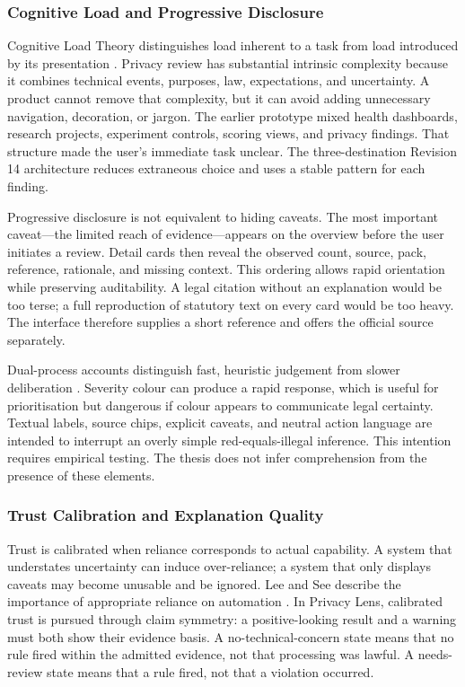 \subsubsection{Cognitive Load and Progressive Disclosure}

Cognitive Load Theory distinguishes load inherent to a task from load introduced by its presentation \cite{27}. Privacy review has substantial intrinsic complexity because it combines technical events, purposes, law, expectations, and uncertainty. A product cannot remove that complexity, but it can avoid adding unnecessary navigation, decoration, or jargon. The earlier prototype mixed health dashboards, research projects, experiment controls, scoring views, and privacy findings. That structure made the user's immediate task unclear. The three-destination Revision 14 architecture reduces extraneous choice and uses a stable pattern for each finding.

Progressive disclosure is not equivalent to hiding caveats. The most important caveat---the limited reach of evidence---appears on the overview before the user initiates a review. Detail cards then reveal the observed count, source, pack, reference, rationale, and missing context. This ordering allows rapid orientation while preserving auditability. A legal citation without an explanation would be too terse; a full reproduction of statutory text on every card would be too heavy. The interface therefore supplies a short reference and offers the official source separately.

Dual-process accounts distinguish fast, heuristic judgement from slower deliberation \cite{22}. Severity colour can produce a rapid response, which is useful for prioritisation but dangerous if colour appears to communicate legal certainty. Textual labels, source chips, explicit caveats, and neutral action language are intended to interrupt an overly simple red-equals-illegal inference. This intention requires empirical testing. The thesis does not infer comprehension from the presence of these elements.

\subsubsection{Trust Calibration and Explanation Quality}

Trust is calibrated when reliance corresponds to actual capability. A system that understates uncertainty can induce over-reliance; a system that only displays caveats may become unusable and be ignored. Lee and See describe the importance of appropriate reliance on automation \cite{34}. In Privacy Lens, calibrated trust is pursued through claim symmetry: a positive-looking result and a warning must both show their evidence basis. A no-technical-concern state means that no rule fired within the admitted evidence, not that processing was lawful. A needs-review state means that a rule fired, not that a violation occurred.

